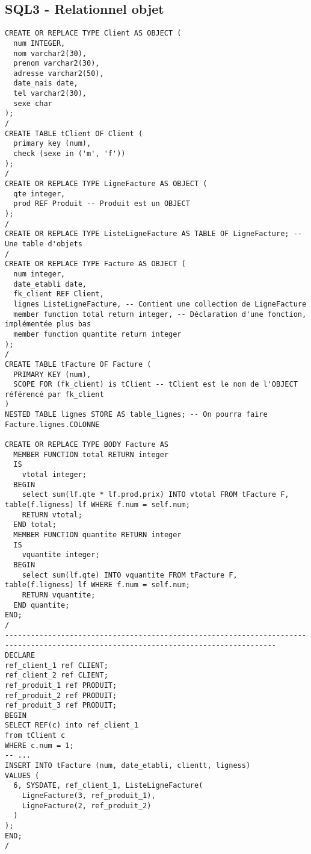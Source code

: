 \documentclass[11pt,a4paper,oneside,french,svgnames]{report}
\newcommand{\code}[2]{\lstset{
  language=#2,
  title={{\setlength{\fboxsep}{1pt}\fcolorbox{orange}{yellow!20}{\sffamily\scriptsize
              \textcolor{gray!10}{\_}{#1}\textcolor{gray!10}{\_}}}}
  }
}
\begin{document}
\subsection*{SQL3 - Relationnel objet}
\code{PL/SQL}{SQL}
\begin{lstlisting}
CREATE OR REPLACE TYPE Client AS OBJECT (
  num INTEGER,
  nom varchar2(30),
  prenom varchar2(30),
  adresse varchar2(50),
  date_nais date,
  tel varchar2(30),
  sexe char
);
/
CREATE TABLE tClient OF Client (
  primary key (num),
  check (sexe in ('m', 'f'))
);
/
CREATE OR REPLACE TYPE LigneFacture AS OBJECT (
  qte integer,
  prod REF Produit -- Produit est un OBJECT
);
/
CREATE OR REPLACE TYPE ListeLigneFacture AS TABLE OF LigneFacture; -- Une table d'objets
/
CREATE OR REPLACE TYPE Facture AS OBJECT (
  num integer,
  date_etabli date,
  fk_client REF Client,
  lignes ListeLigneFacture, -- Contient une collection de LigneFacture
  member function total return integer, -- Déclaration d'une fonction, implémentée plus bas
  member function quantite return integer
);
/
CREATE TABLE tFacture OF Facture (
  PRIMARY KEY (num),
  SCOPE FOR (fk_client) is tClient -- tClient est le nom de l'OBJECT référencé par fk_client
)
NESTED TABLE lignes STORE AS table_lignes; -- On pourra faire Facture.lignes.COLONNE

CREATE OR REPLACE TYPE BODY Facture AS
  MEMBER FUNCTION total RETURN integer
  IS
    vtotal integer;
  BEGIN
    select sum(lf.qte * lf.prod.prix) INTO vtotal FROM tFacture F, table(f.ligness) lf WHERE f.num = self.num;
    RETURN vtotal;
  END total;
  MEMBER FUNCTION quantite RETURN integer
  IS
    vquantite integer;
  BEGIN
    select sum(lf.qte) INTO vquantite FROM tFacture F, table(f.ligness) lf WHERE f.num = self.num;
    RETURN vquantite;
  END quantite;
END;
/
-------------------------------------------------------------------------------------------------------------------------------------
DECLARE
ref_client_1 ref CLIENT;
ref_client_2 ref CLIENT;
ref_produit_1 ref PRODUIT;
ref_produit_2 ref PRODUIT;
ref_produit_3 ref PRODUIT;
BEGIN
SELECT REF(c) into ref_client_1
from tClient c
WHERE c.num = 1;
-- ...
INSERT INTO tFacture (num, date_etabli, clientt, ligness)
VALUES (
  6, SYSDATE, ref_client_1, ListeLigneFacture(
    LigneFacture(3, ref_produit_1),
    LigneFacture(2, ref_produit_2)
  )
);
END;
/
\end{lstlisting}
\end{document}
